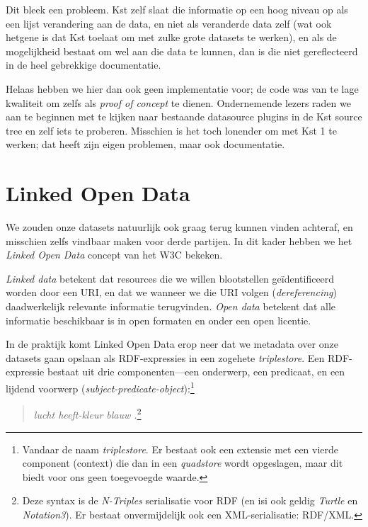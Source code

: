 \documentclass[a4paper]{article}
\begin{document}
Dit bleek een probleem. Kst zelf slaat die informatie op een hoog niveau op
als een lijst verandering aan de data, en niet als veranderde data zelf (wat
ook hetgene is dat Kst toelaat om met zulke grote datasets te werken), en als
de mogelijkheid bestaat om wel aan die data te kunnen, dan is die niet
gereflecteerd in de heel gebrekkige documentatie.

Helaas hebben we hier dan ook geen implementatie voor; de code was van te lage
kwaliteit om zelfs als {\it proof of concept} te dienen. Ondernemende lezers
raden we aan te beginnen met te kijken naar bestaande datasource plugins in de
Kst source tree en zelf iets te proberen. Misschien is het toch lonender om met
Kst 1 te werken; dat heeft zijn eigen problemen, maar ook documentatie.

\newpage

\section{Linked Open Data}
\label{sec:rdf}

We zouden onze datasets natuurlijk ook graag terug kunnen vinden achteraf, en
misschien zelfs vindbaar maken voor derde partijen. In dit kader hebben we het
{\it Linked Open Data} concept van het \gls{W3C} bekeken.

{\it Linked data} betekent dat resources die we willen blootstellen
ge\"identificeerd worden door een \gls{URI}, en dat we wanneer we die \gls{URI}
volgen ({\it dereferencing}) daadwerkelijk relevante informatie terugvinden.
{\it Open data} betekent dat alle informatie beschikbaar is in open formaten
en onder een open licentie.

In de praktijk komt Linked Open Data erop neer dat we metadata over onze
datasets gaan opslaan als \gls{RDF}-expressies in een zogehete
{\it triplestore}. Een \gls{RDF}-expressie bestaat uit drie
componenten---een onderwerp, een predicaat, en een lijdend voorwerp
({\it subject-predicate-object}):\footnote{
    Vandaar de naam {\it triplestore}. Er bestaat ook een extensie met een
    vierde component (context) die dan in een {\it quadstore} wordt opgeslagen,
    maar dit biedt voor ons geen toegevoegde waarde.
}

\begin{quotation}
    {\it lucht heeft-kleur blauw .}\footnote{
        Deze syntax is de {\it N-Triples} serialisatie voor \gls{RDF} (en isi
        ook geldig {\it Turtle} en {\it Notation3}). Er bestaat onvermijdelijk
        ook een \gls{XML}-serialisatie: \gls{RDF}/\gls{XML}.
    }
\end{quotation}
\end{document}
